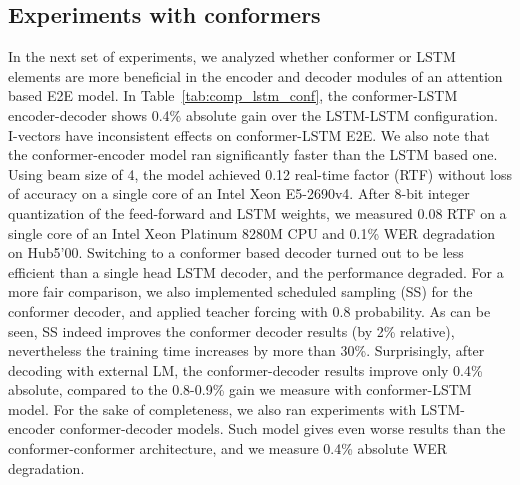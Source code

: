 \documentclass[a4paper]{article}
\begin{document}
\subsection{Experiments with conformers}
\label{sec:expconf}
\vspace{-1.5mm}
In the next set of experiments, we analyzed whether conformer or LSTM elements are more beneficial in the encoder and decoder modules of an attention based E2E model.
In Table~\ref{tab:comp_lstm_conf}, the conformer-LSTM encoder-decoder shows 0.4\% absolute gain over the LSTM-LSTM configuration.
I-vectors have inconsistent effects on conformer-LSTM E2E.
We also note that the conformer-encoder model ran significantly faster than the LSTM based one.
Using beam size of 4, the model achieved 0.12 real-time factor (RTF) without loss of accuracy on a single core of an Intel Xeon E5-2690v4.
After 8-bit integer quantization of the feed-forward and LSTM weights, we measured 0.08 RTF on a single core of an Intel Xeon Platinum 8280M CPU and 0.1\% WER degradation on Hub5'00.
Switching to a conformer based decoder turned out to be less efficient than a single head LSTM decoder, and the performance degraded.
For a more fair comparison, we also implemented scheduled sampling (SS) for the conformer decoder, and applied teacher forcing with 0.8 probability.
As can be seen, SS indeed improves the conformer decoder results (by 2\% relative), nevertheless the training time increases by more than 30\%.
Surprisingly, after decoding with external LM, the conformer-decoder results improve only 0.4\% absolute, compared to the 0.8-0.9\% gain we measure with conformer-LSTM model.
For the sake of completeness, we also ran experiments with LSTM-encoder conformer-decoder models.
Such model gives even worse results than the conformer-conformer architecture, and we measure 0.4\% absolute WER degradation.
\end{document}
